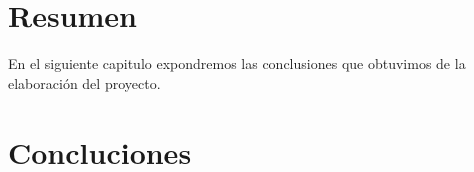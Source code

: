 \chapter*{Resumen}
En el siguiente capitulo expondremos las conclusiones que obtuvimos de la elaboración del proyecto.
\chapter{Concluciones}

